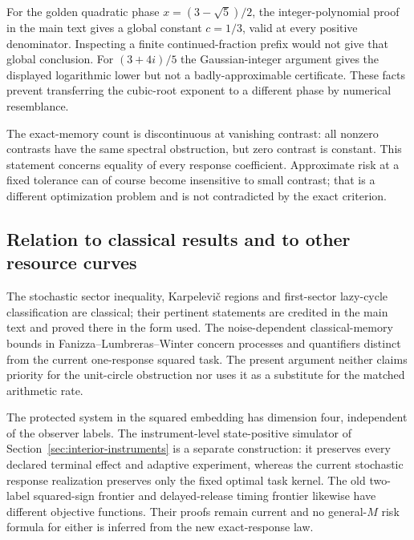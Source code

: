 For the golden quadratic phase $x=(3-\sqrt5)/2$, the integer-polynomial proof in the main text gives a global constant $c=1/3$, valid at every positive denominator. Inspecting a finite continued-fraction prefix would not give that global conclusion. For $(3+4i)/5$ the Gaussian-integer argument gives the displayed logarithmic lower but not a badly-approximable certificate. These facts prevent transferring the cubic-root exponent to a different phase by numerical resemblance.

The exact-memory count is discontinuous at vanishing contrast: all nonzero contrasts have the same spectral obstruction, but zero contrast is constant. This statement concerns equality of every response coefficient. Approximate risk at a fixed tolerance can of course become insensitive to small contrast; that is a different optimization problem and is not contradicted by the exact criterion.

\subsection{Relation to classical results and to other resource curves}
The stochastic sector inequality, Karpelevi\v c regions and first-sector lazy-cycle classification are classical; their pertinent statements are credited in the main text and proved there in the form used. The noise-dependent classical-memory bounds in Fanizza--Lumbreras--Winter concern processes and quantifiers distinct from the current one-response squared task. The present argument neither claims priority for the unit-circle obstruction nor uses it as a substitute for the matched arithmetic rate.

The protected system in the squared embedding has dimension four, independent of the observer labels. The instrument-level state-positive simulator of Section~\ref{sec:interior-instruments} is a separate construction: it preserves every declared terminal effect and adaptive experiment, whereas the current stochastic response realization preserves only the fixed optimal task kernel. The old two-label squared-sign frontier and delayed-release timing frontier likewise have different objective functions. Their proofs remain current and no general-$M$ risk formula for either is inferred from the new exact-response law.
